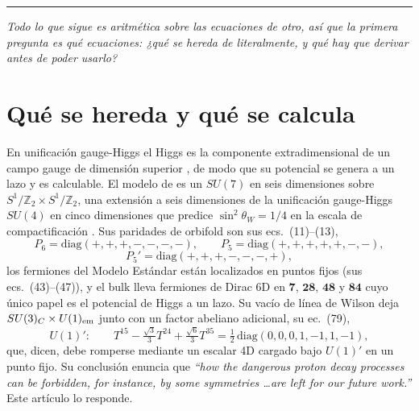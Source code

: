 \documentclass[11pt,a4paper]{article}
\newcommand{\ZZ}{\mathbb{Z}}
\newcommand{\su}[1]{SU(#1)}
\newcommand{\rep}[1]{\mathbf{#1}}
\newcommand{\bridge}[1]{\par\medskip\noindent
  \textcolor{hdrblue!45}{\rule{2.2cm}{0.6pt}}\;\;\parbox[t]{0.84\textwidth}{\small\itshape
  \textcolor{hdrblue!85}{#1}}\par\medskip}
\begin{document}
\bridge{Todo lo que sigue es aritmética sobre las ecuaciones de otro, así que la primera pregunta es
qué ecuaciones: ¿qué se hereda de \cite{KM25} literalmente, y qué hay que derivar antes de poder
usarlo?}

\section{Qué se hereda y qué se calcula}\label{sec:setting}

En unificación gauge-Higgs el Higgs es la componente extradimensional de un campo gauge de dimensión
superior \cite{Manton,Hosotani}, de modo que su potencial se genera a un lazo y es calculable. El
modelo de \cite{KM25} es un $\su7$ en seis dimensiones sobre $S^1/\ZZ_2\times S^1/\ZZ_2$, una extensión
a seis dimensiones de la unificación gauge-Higgs $\su4$ en cinco dimensiones que predice
$\sin^2\theta_W=1/4$ en la escala de compactificación \cite{AHMN}. Sus paridades de orbifold son sus
ecs.~(11)--(13),
\[
P_6=\mathrm{diag}(+,+,+,-,-,-,-),\qquad
P_5=\mathrm{diag}(+,+,+,+,+,-,-),
\]
\[
P_5'=\mathrm{diag}(+,+,+,-,-,-,+),
\]
los fermiones del Modelo Estándar están localizados en puntos fijos (sus ecs.~(43)--(47)), y el bulk
lleva fermiones de Dirac 6D en $\rep7$, $\rep{28}$, $\rep{48}$ y $\rep{84}$ cuyo único papel es el
potencial de Higgs a un lazo. Su vacío de línea de Wilson deja $\su3_C\times U(1)_{\rm em}$ junto con
un factor abeliano adicional, su ec.~(79),
\begin{equation}\label{eq:u1p}
U(1)':\qquad T^{15}-\tfrac{\sqrt3}{3}T^{24}+\tfrac{\sqrt6}{3}T^{35}
=\tfrac12\,\mathrm{diag}(0,0,0,1,-1,1,-1),
\end{equation}
que, dicen, debe romperse mediante un escalar 4D cargado bajo $U(1)'$ en un punto fijo. Su conclusión
enuncia que \emph{``how the dangerous proton decay processes can be forbidden, for instance, by some
symmetries \dots are left for our future work.''} Este artículo lo responde.
\end{document}
